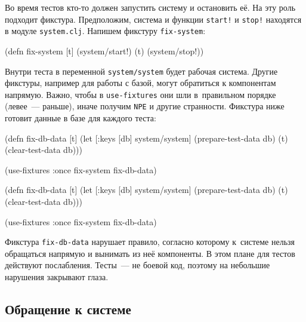 Во время тестов кто-то должен запустить систему и остановить её. На эту роль
подходит фикстура. Предположим, система и функции \verb|start!| и \verb|stop!|
находятся в модуле \verb|system.clj|. Напишем фикстуру \verb|fix-system|:

\pagebreakafive

\begin{english}
  \begin{clojure}
(defn fix-system
  [t]
  (system/start!)
  (t)
  (system/stop!))
  \end{clojure}
\end{english}

Внутри теста в переменной \verb|system/system| будет рабочая система. Другие
фикстуры, например для работы с базой, могут обратиться к компонентам
напрямую. Важно, чтобы в \verb|use-fixtures| они шли в~правильном порядке
(левее~--- раньше), иначе получим \verb|NPE| и другие странности. Фикстура ниже
готовит данные в базе для каждого теста:

\pagebreaklarge


\ifnarrow

\begin{english}
  \begin{clojure}
(defn fix-db-data
  [t]
  (let [{:keys [db]} system/system]
    (prepare-test-data db)
    (t)
    (clear-test-data db)))

(use-fixtures :once
  fix-system fix-db-data)
  \end{clojure}
\end{english}

\else

\begin{english}
  \begin{clojure}
(defn fix-db-data
  [t]
  (let [{:keys [db]} system/system]
    (prepare-test-data db)
    (t)
    (clear-test-data db)))

(use-fixtures :once fix-system fix-db-data)
  \end{clojure}
\end{english}

\fi

Фикстура \verb|fix-db-data| нарушает правило, согласно которому к~системе нельзя
обращаться напрямую и вынимать из неё компоненты. В этом плане для тестов
действуют послабления. Тесты~--- не боевой код, поэтому на небольшие нарушения
закрывают глаза.

\subsection{Обращение к системе}


